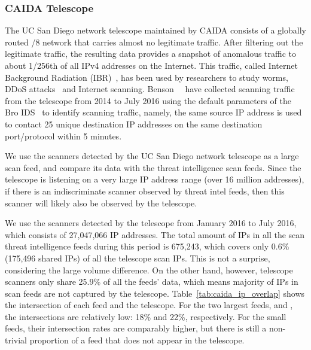 \subsubsection{CAIDA Telescope}
\label{sec:caida}

The UC San Diego network telescope maintained by CAIDA consists of a globally
routed /8 network that carries almost no legitimate traffic. After filtering
out the legitimate traffic, the resulting data provides a snapshot of anomalous
traffic to about 1/256th of all IPv4 addresses on the Internet. This traffic,
called Internet Background Radiation (IBR)~\cite{pang2004characteristics},
has been used by researchers to study worms, DDoS attacks~\cite{moore2006inferring}
and Internet scanning. Benson~\etal~\cite{benson2015leveraging} have collected
scanning traffic from the telescope from 2014 to July 2016 using the default
parameters of the Bro IDS~\cite{BroNetwork} to identify scanning traffic, namely,
the same source IP address is used to contact 25 unique destination IP addresses
on the same destination port/protocol within 5 minutes.

We use the scanners detected by the UC San Diego network telescope as a large
scan feed, and compare its data with the threat intelligence scan
feeds. Since the telescope is listening on a very large IP address
range (over 16 million addresses), if there is an indiscriminate
scanner observed by threat intel feeds, then this scanner will likely
also be observed by the telescope.


We use the scanners detected by the telescope from January 2016 to
July 2016, which consists of 27,047,066 IP addresses. The total amount
of IPs in all the scan threat intelligence feeds during this period is
675,243, which covers only 0.6\%(175,496 shared IPs) of all the
telescope scan IPs. This is not a surprise, considering the large volume
difference. On the other hand, however, telescope scanners only share 25.9\%
of all the feeds' data, which means majority of IPs in scan feeds are not
captured by the telescope. Table~\ref{tab:caida_ip_overlap} shows
the intersection of each feed and the telescope. For the two largest
feeds, {\feedTSSnort} and {\feedetiprep}, the intersections are
relatively low: 18\% and 22\%, respectively.
For the small feeds, their intersection rates are
comparably higher, but there is still a non-trivial proportion of a feed
that does not appear in the telescope.

